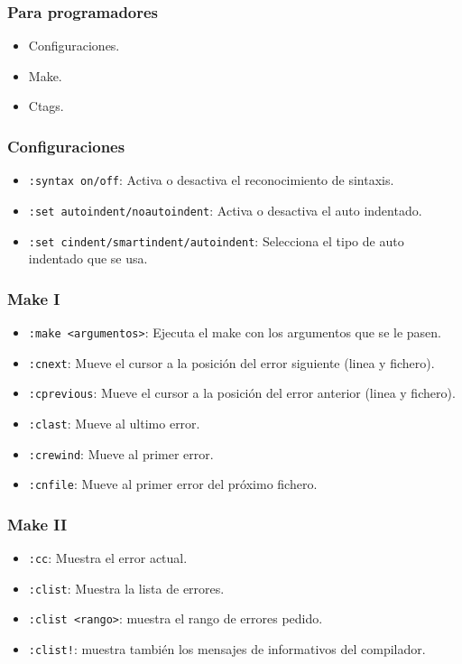 \documentclass[10pt]{beamer}
\begin{document}
  \begin{frame}[containsverbatim]
    \frametitle{Para programadores}
    \begin{itemize}
      \item Configuraciones.
      \item Make.
      \item Ctags.
    \end{itemize}
  \end{frame}
  
  \begin{frame}[containsverbatim]
    \frametitle{Configuraciones}
    \begin{itemize}
      \item \verb+:syntax on/off+: Activa o desactiva el reconocimiento de sintaxis.
      \item \verb+:set autoindent/noautoindent+: Activa o desactiva el auto indentado.
      \item \verb+:set cindent/smartindent/autoindent+: Selecciona el tipo de auto indentado que se usa.
    \end{itemize}
  \end{frame}
  
  \begin{frame}[containsverbatim]
    \frametitle{Make I}
    \begin{itemize}
      \item \verb+:make <argumentos>+: Ejecuta el make con los argumentos que se le pasen.
      \item \verb+:cnext+: Mueve el cursor a la posición del error siguiente (linea y fichero).
      \item \verb+:cprevious+: Mueve el cursor a la posición del error anterior (linea y fichero).
      \item \verb+:clast+: Mueve al ultimo error.
      \item \verb+:crewind+: Mueve al primer error.
      \item \verb+:cnfile+: Mueve al primer error del próximo fichero.
    \end{itemize}
  \end{frame}
  
  \begin{frame}[containsverbatim]
    \frametitle{Make II}
    \begin{itemize}
      \item \verb+:cc+: Muestra el error actual.
      \item \verb+:clist+: Muestra la lista de errores.
      \item \verb+:clist <rango>+: muestra el rango de errores pedido.
      \item \verb+:clist!+: muestra también los mensajes de informativos del compilador.
    \end{itemize}
  \end{frame}
  
\end{document}
